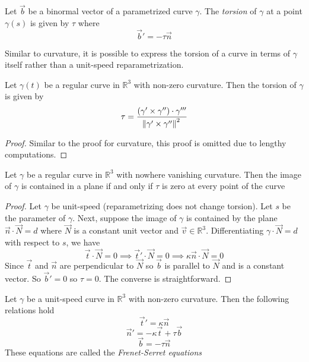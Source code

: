 \begin{definition}
  Let \(\vec{b}\) be a binormal vector of a parametrized curve \(\gamma\). The
  \textit{torsion} of \(\gamma\) at a point \(\gamma(s)\) is given by \(\tau\) where
  \[
\vec{b}' = -\tau \vec{n}
\]
\end{definition}

Similar to curvature, it is possible to express the torsion of a curve in terms
of \(\gamma\) itself rather than a unit-speed reparametrization.

\begin{proposition}
  Let \(\gamma(t)\) be a regular curve in \(\mathbb{R}^{3}\) with non-zero curvature. Then the
  torsion of \(\gamma\) is given by
  \[
\tau = \frac{(\gamma' \times \gamma'')\cdot \gamma'''}{\norm{\gamma' \times \gamma''}^{2}}
\]

  \begin{proof}
    Similar to the proof for curvature, this proof is omitted due to lengthy computations.
  \end{proof}
\end{proposition}

\begin{proposition}
  Let \(\gamma\) be a regular curve in \(\mathbb{R}^{3}\) with nowhere vanishing curvature. Then
  the image of \(\gamma\) is contained in a plane if and only if \(\tau\) is zero at every
  point of the curve

  \begin{proof}
    Let \(\gamma\) be unit-speed (reparametrizing does not change torsion). Let \(s\) be
    the parameter of \(\gamma\). Next, suppose the image of \(\gamma\) is contained by the
    plane \(\vec{n}\cdot \vec{N} = d\) where \(\vec{N}\) is a constant unit vector and
    \(\vec{v}\in \mathbb{R}^{3}\). Differentiating \(\gamma\cdot \vec{N} = d\) with respect to \(s\), we have
    \[
\vec{t}\cdot \vec{N} = 0 \implies \vec{t}' \cdot \vec{N} = 0 \implies \kappa \vec{n}\cdot \vec{N}
      = 0
\]
    Since \(\vec{t}\) and \(\vec{n}\) are perpendicular to \(\vec{N}\) so \(\vec{b}\) is
    parallel to \(\vec{N}\) and is a constant vector. So \(\vec{b}' = 0\) so \(\tau =
    0\).
    The converse is straightforward.
  \end{proof}
\end{proposition}

\begin{theorem}
  Let \(\gamma\) be a unit-speed curve in \(\mathbb{R}^{3}\) with non-zero curvature. Then the
  following relations hold
  \[
\vec{t}' = \kappa \vec{n}
\]
  \[
\vec{n}' = -\kappa \vec{t} + \tau \vec{b}
\]
  \[
\vec{b} = -\tau \vec{n}
\]
  These equations are called the \textit{Frenet-Serret
    equations}
\end{theorem}

